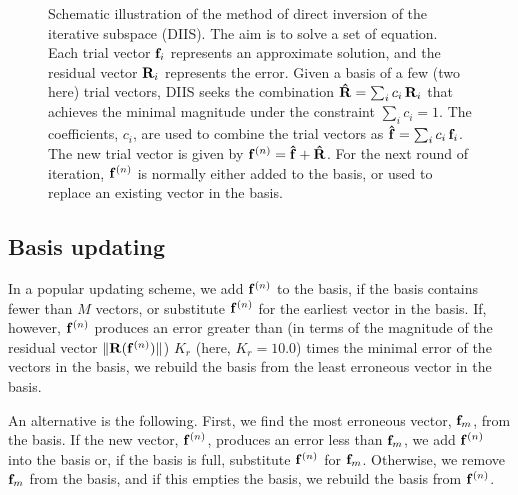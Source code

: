 \documentclass[aip,jcp,preprint,superscriptaddress]{revtex4-1}
\begin{document}
\begin{figure}
  \caption{\label{fig:scheme}
    Schematic illustration of the method of
    direct inversion of the iterative subspace (DIIS).
    The aim is to solve a set of equation.
    Each trial vector $\mathbf{f}_i$
    represents an approximate solution,
    and the residual vector $\mathbf{R}_i$
    represents the error.
    Given a basis of a few (two here) trial vectors,
    DIIS seeks the combination
    $\mathbf{\hat R} = \sum_i c_i \, \mathbf{R}_i$
    that achieves the minimal magnitude
    under the constraint
    $\sum_i c_i = 1$.
    The coefficients, $c_i$, are used
    to combine the trial vectors as
    $\mathbf{\hat f} = \sum_i c_i \, \mathbf{f}_i$.
    The new trial vector is given by
    $\mathbf{f}^{(n)} = \mathbf{\hat f} + \mathbf{\hat R}$.
    For the next round of iteration,
    $\mathbf{f}^{(n)}$ is normally either added
    to the basis, or used to replace an existing vector
    in the basis.
  }
\end{figure}




\subsection{Basis updating}



In a popular updating scheme\cite{kovalenko1999},
we add $\mathbf{f}^{(n)}$ to the basis,
if the basis contains fewer than $M$ vectors,
%
or substitute $\mathbf{f}^{(n)}$ for the earliest vector in the basis.
%
If, however, $\mathbf{f}^{(n)}$
produces an error greater than
(in terms of the magnitude of the residual vector $\| \mathbf{R}(\mathbf{f}^{(n)}) \|$)
$K_r$ (here, $K_r = 10.0$\cite{kovalenko1999})
times the minimal error of the vectors in the basis,
%
we rebuild the basis
from the least erroneous vector
in the basis.



An alternative is the following.
%
First, we find the most erroneous vector,
$\mathbf{f}_m$, from the basis.
%
If the new vector, $\mathbf{f}^{(n)}$,
produces an error less than $\mathbf{f}_m$,
we add $\mathbf{f}^{(n)}$ into the basis
or, if the basis is full,
substitute $\mathbf{f}^{(n)}$ for $\mathbf{f}_m$.
%
Otherwise,
we remove $\mathbf{f}_m$ from the basis,
and if this empties the basis,
we rebuild the basis from $\mathbf{f}^{(n)}$.
%
\end{document}
